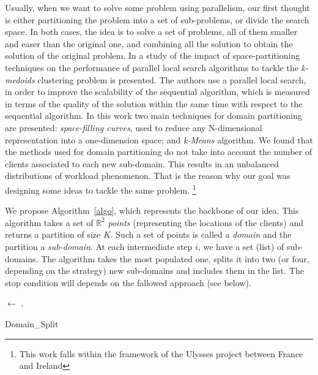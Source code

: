 
Usually, when we want to solve some problem using parallelism, our first thought is either partitioning the problem into a set of sub-problems, or divide the search space. In both cases, the idea is to solve a set of problems, all of them smaller and easer than the original one, and combining all the solution to obtain the solution of the original problem. In \cite{Arbelaez2012} a study of the impact of space-partitioning techniques on the performance of parallel local search algorithms to tackle the \textit{k-medoids} clustering problem is presented. The authors use a parallel local search, in order to improve the scalability of the sequential algorithm, which is measured in terms of the quality of the solution within the same time with respect to the sequential algorithm. In this work two main techniques for domain partitioning are presented: {\it space-filling curves}, used to reduce any N-dimensional representation into a one-dimension space; and {\it k-Means} algorithm. We found that the methods used for domain partitioning do not take into account the number of clients associated to each new sub-domain. This results in an unbalanced distributions of workload phenomenon. That is the reason why our goal was designing some ideas to tackle the same problem. \footnote{This work falls within the framework of the Ulysses project between France and Ireland}

We propose Algorithm~\ref{algo}, which represents the backbone of our idea. This algorithm takes a set of $\mathbb{R}^2$ {\it points} (representing the locations of the clients) and returns a partition of size $K$. Such a set of points is called a {\it domain} and the partition a {\it sub-domain}. At each intermediate step $i$, we have a set (list) of sub-domains. The algorithm takes the most populated one, splits it into two (or four, depending on the strategy) new sub-domains and includes them in the list. The stop condition will depends on the fallowed approach (see below).

\incmargin{1.4em}
\linesnumbered
\begin{algorithm}[H]
\dontprintsemicolon
\SetLine
{}

\BlankLine

\A $\leftarrow$ \Uni\;
\Q .\Insert{\A}\;
\caption{Domain\_Split}
\label{algo}
\end{algorithm}

